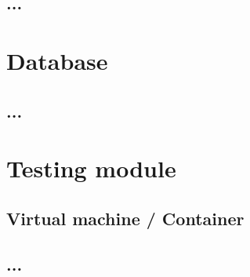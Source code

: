 \subsection{...}

\section{Database}

\subsection{...}

\section{Testing module}

\subsection{Virtual machine / Container}

\subsection{...}